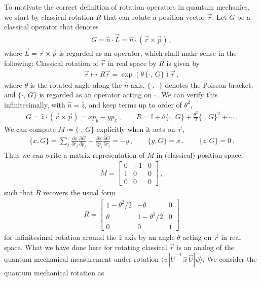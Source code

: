 \documentclass[11pt, onesided]{book}
\theoremstyle{break}
\theoremstyle{break}
\newcommand{\pd}{\partial}
\newcommand{\bmat}[1]{\begin{bmatrix} #1 \end{bmatrix}}
\begin{document}
To motivate the correct definition of rotation operators in quantum mechanics, we start by classical rotation $R$ that can rotate a position vector $\vec{r}$. Let $G$ be a classical operator that denotes 
\begin{align*}
G = \hat{n}\cdot \vec{L} = \hat{n}\cdot \left( \vec{r}\times \vec{p}\right)\,,
\end{align*}
where $\vec{L} = \vec{r}\times \vec{p}$ is regarded as an operator, which shall make sense in the following: Classical rotation of $\vec{r}$ in real space by $R$ is given by
\begin{align*}
\vec{r}\mapsto R\vec{r} = \exp\left( \theta\, \{\cdot, \, G\}\right) \vec{r}\,,
\end{align*}
where $\theta$ is the rotated angle along the $\hat{n}$ axis, $\{\cdot,\,\cdot\}$ denotes the Poisson bracket, and $\{\cdot,\,G\}$ is regarded as an operator acting on $\cdot$\,. We can verify this infinitesimally, with $\hat{n} =\hat{z}$, and keep terms up to order of $\theta^2$,
\begin{align*}
G = \hat{z}\cdot (\vec{r}\times \vec{p}) = xp_y - yp_x\,,\qquad
R =\mathbb{I} + 
\theta \{\cdot,\, G\} + \frac{\theta^2}{2}\{\cdot,\, G\}^2+\cdots\,.
\end{align*}
We can compute $M \coloneqq \{\cdot,\, G\}$ explicitly when it acts on $\vec{r}$, 
\begin{align*}
\{x, G\} = \sum_j \frac{\pd x}{\pd r_j}\frac{\pd G}{\pd p_j} - \frac{\pd x}{\pd p_j}\frac{\pd G}{\pd r_j}=-y\,,\qquad
\{y, G\}=x\,,\qquad
\{z, G\} =0\,.
\end{align*}
Thus we can write a matrix representation of $M$ in (classical) position space, 
\begin{align*}
M = \bmat{0 & -1 & 0 \\ 1 & 0 & 0 \\ 0 & 0 & 0}\,,
\end{align*}
such that $R$ recovers the usual form 
\begin{align*}
R = \bmat{1-\theta^2/2 & -\theta & 0 \\ \theta & 1-\theta^2/2 & 0 \\ 0 & 0 & 1}
\end{align*}
for infinitesimal rotation around the $\hat{z}$ axis by an angle $\theta$ acting on $\vec{r}$ in real space. 
What we have done here for rotating classical $\vec{r}$ is an analog of the quantum mechanical measurement under rotation $\langle \psi | \hat{U}^{-1}\, \hat{x}\, \hat{U}|\psi\rangle$. We consider the quantum mechanical rotation as 
\end{document}
